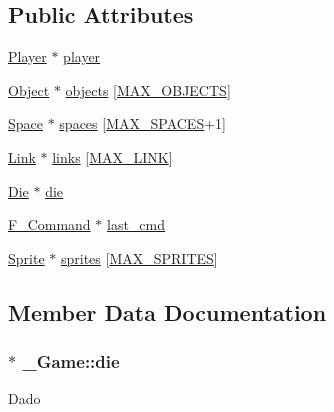 \subsection*{Public Attributes}
\begin{DoxyCompactItemize}
\item 
\hyperlink{player_8h_af30e2030635a69690f85e48bc6ef202f}{Player} $\ast$ \hyperlink{struct__Game_a31406605782d71ec00c4bf258ea76267}{player}
\item 
\hyperlink{object_8h_a7f8bbcda919b65ce67f92fba08e0212f}{Object} $\ast$ \hyperlink{struct__Game_ad45bf5645a26e546d0060a2e61f9cf81}{objects} \mbox{[}\hyperlink{game_8h_acdc7844fbd4d45737d4aa56834d37829}{M\+A\+X\+\_\+\+O\+B\+J\+E\+C\+TS}\mbox{]}
\item 
\hyperlink{space_8h_a67533ffc2b70463baecc38fb0629bbfc}{Space} $\ast$ \hyperlink{struct__Game_ab4180417d9148f8abb2233ca6c4ecfe5}{spaces} \mbox{[}\hyperlink{space_8h_a5f54fd55f983a2e33ce076cd9f587e82}{M\+A\+X\+\_\+\+S\+P\+A\+C\+ES}+1\mbox{]}
\item 
\hyperlink{link_8h_ae3b299941e67be6971bfd64a25505eff}{Link} $\ast$ \hyperlink{struct__Game_aa4ff88aaf2a54616e5863609effad94e}{links} \mbox{[}\hyperlink{link_8h_abfa744c8ca5b46f7f2a10aea53a4ec59}{M\+A\+X\+\_\+\+L\+I\+NK}\mbox{]}
\item 
\hyperlink{die_8h_a892f0b0bf81d69a1f7a14ea238e36dd3}{Die} $\ast$ \hyperlink{struct__Game_a0d6009b5dcb080489c192a9198fa7d46}{die}
\item 
\hyperlink{command_8h_a76085817cb558dc3640088040ba47898}{F\+\_\+\+Command} $\ast$ \hyperlink{struct__Game_a6dd34045346b3ea8dd1a4e3f08ab71c5}{last\+\_\+cmd}
\item 
\hyperlink{sprite_8h_a4dac9894071cab0926c0b91f2fe6e9cf}{Sprite} $\ast$ \hyperlink{struct__Game_a457e4328c3dfd137ba4407ad8e041cf2}{sprites} \mbox{[}\hyperlink{types_8h_aeb21c7ac080eea985b7701df626d9cf4}{M\+A\+X\+\_\+\+S\+P\+R\+I\+T\+ES}\mbox{]}
\end{DoxyCompactItemize}


\subsection{Member Data Documentation}
\subsubsection[{\texorpdfstring{die}{die}}]{$\ast$ \+\_\+\+Game\+::die}\hypertarget{struct__Game_a0d6009b5dcb080489c192a9198fa7d46}{}\label{struct__Game_a0d6009b5dcb080489c192a9198fa7d46}
Dado 
